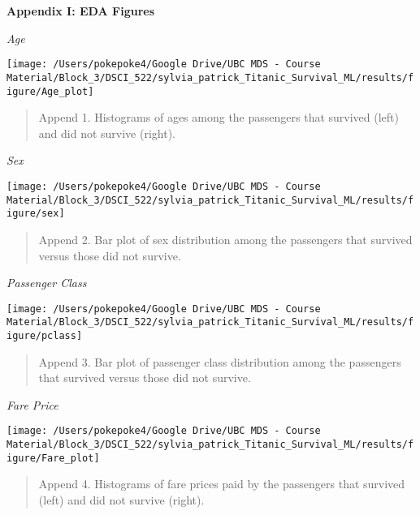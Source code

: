 \documentclass[]{article}
\begin{document}
\textbf{Appendix I: EDA Figures}

\emph{Age}

\begin{center}\texttt{[image: /Users/pokepoke4/Google Drive/UBC MDS - Course Material/Block\_3/DSCI\_522/sylvia\_patrick\_Titanic\_Survival\_ML/results/figure/Age\_plot]} \end{center}

\begin{quote}
Append 1. Histograms of ages among the passengers that survived (left)
and did not survive (right).
\end{quote}

\newpage

\emph{Sex}

\begin{center}\texttt{[image: /Users/pokepoke4/Google Drive/UBC MDS - Course Material/Block\_3/DSCI\_522/sylvia\_patrick\_Titanic\_Survival\_ML/results/figure/sex]} \end{center}

\begin{quote}
Append 2. Bar plot of sex distribution among the passengers that
survived versus those did not survive.
\end{quote}

\newpage

\emph{Passenger Class}

\begin{center}\texttt{[image: /Users/pokepoke4/Google Drive/UBC MDS - Course Material/Block\_3/DSCI\_522/sylvia\_patrick\_Titanic\_Survival\_ML/results/figure/pclass]} \end{center}

\begin{quote}
Append 3. Bar plot of passenger class distribution among the passengers
that survived versus those did not survive.
\end{quote}

\newpage

\emph{Fare Price}

\begin{center}\texttt{[image: /Users/pokepoke4/Google Drive/UBC MDS - Course Material/Block\_3/DSCI\_522/sylvia\_patrick\_Titanic\_Survival\_ML/results/figure/Fare\_plot]} \end{center}

\begin{quote}
Append 4. Histograms of fare prices paid by the passengers that survived
(left) and did not survive (right).
\end{quote}
\end{document}
